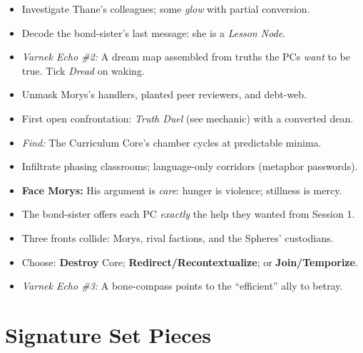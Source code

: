 \documentclass[11pt,twoside]{book}
\newcommand{\Session}[2]{%
  \begin{adventurebox}[frametitle={Session #1: #2}]
}
\newcommand{\EndSession}{%
  \end{adventurebox}
}
\begin{document}
\Session{2}{Ledgers and Lullabies}
\begin{itemize}[leftmargin=*]
  \item Investigate Thane's colleagues; some \emph{glow} with partial conversion.
  \item Decode the bond-sister's last message: she is a \emph{Lesson Node}.
  \item \emph{Varnek Echo \#2:} A dream map assembled from truths the PCs \emph{want} to be true. Tick \emph{Dread} on waking.
\end{itemize}
\EndSession

\Session{3}{The Scholar is the Crime}
\begin{itemize}[leftmargin=*]
  \item Unmask Morys's handlers, planted peer reviewers, and debt-web.
  \item First open confrontation: \emph{Truth Duel} (see mechanic) with a converted dean.
  \item \emph{Find:} The Curriculum Core's chamber cycles at predictable minima.
\end{itemize}
\EndSession

\Session{4}{The Core Sings Back}
\begin{itemize}[leftmargin=*]
  \item Infiltrate phasing classrooms; language-only corridors (metaphor passwords).
  \item \textbf{Face Morys:} His argument is \emph{care}: hunger is violence; stillness is mercy.
  \item The bond-sister offers each PC \emph{exactly} the help they wanted from Session 1.
\end{itemize}
\EndSession

\Session{5}{Elegy or Refrain}
\begin{itemize}[leftmargin=*]
  \item Three fronts collide: Morys, rival factions, and the Spheres' custodians.
  \item Choose: \textbf{Destroy} Core; \textbf{Redirect/Recontextualize}; or \textbf{Join/Temporize}.
  \item \emph{Varnek Echo \#3:} A bone-compass points to the ``efficient'' ally to betray.
\end{itemize}
\EndSession

\chapter{Signature Set Pieces}
\end{document}
